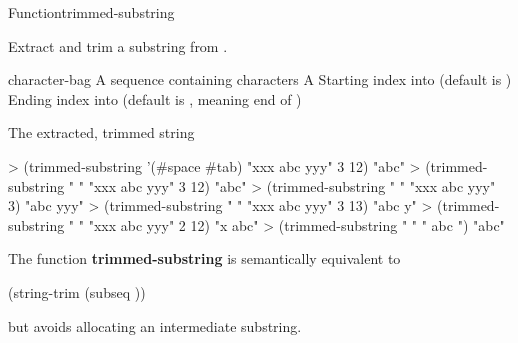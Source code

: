 \documentclass[10pt,twoside,english,pdftex]{article}
\begin{document}

\begin{functiondoc}{Function}{trimmed-substring}%
  {  
    \returns{} }
% 

\fnsyntax

\fnpurpose Extract and trim a substring from .

\fnpackage {}

\fnmodule {}

\fnargs
\begin{args}{character-bag}
 A sequence containing characters
\arg[string] A 
\arg[start] Starting index into  (default is )
\arg[end] Ending index into  (default is \nil, meaning
end of )
\end{args}

\fnreturns The extracted, trimmed string

\fnexamples
\begin{example}
> (trimmed-substring '(#\bkslash{}space #\bkslash{}tab) "xxx   abc   yyy" 3 12)
"abc"
> (trimmed-substring " " "xxx   abc   yyy" 3 12)
"abc"
> (trimmed-substring " " "xxx   abc   yyy" 3)
"abc   yyy"
> (trimmed-substring " " "xxx   abc   yyy" 3 13)
"abc   y"
> (trimmed-substring " " "xxx   abc   yyy" 2 12)
"x   abc"
> (trimmed-substring " " "   abc   ")
"abc"
\end{example}

\fnnote 
The function \textbf{trimmed-substring} is semantically equivalent to
\begin{example}
  (string-trim  (subseq ))
\end{example} 
but avoids allocating an intermediate substring.

\end{functiondoc}

\end{document}
